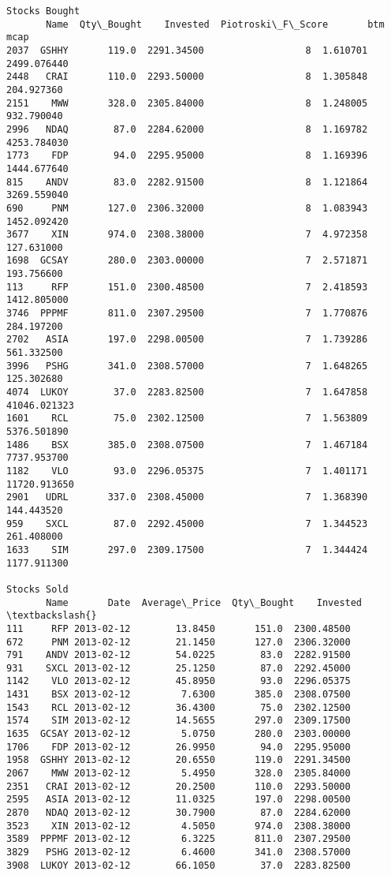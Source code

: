 \documentclass[11pt]{article}
\begin{document}
\begin{Verbatim}[commandchars=\\\{\}]
Stocks Bought
       Name  Qty\_Bought    Invested  Piotroski\_F\_Score       btm          mcap
2037  GSHHY       119.0  2291.34500                  8  1.610701   2499.076440
2448   CRAI       110.0  2293.50000                  8  1.305848    204.927360
2151    MWW       328.0  2305.84000                  8  1.248005    932.790040
2996   NDAQ        87.0  2284.62000                  8  1.169782   4253.784030
1773    FDP        94.0  2295.95000                  8  1.169396   1444.677640
815    ANDV        83.0  2282.91500                  8  1.121864   3269.559040
690     PNM       127.0  2306.32000                  8  1.083943   1452.092420
3677    XIN       974.0  2308.38000                  7  4.972358    127.631000
1698  GCSAY       280.0  2303.00000                  7  2.571871    193.756600
113     RFP       151.0  2300.48500                  7  2.418593   1412.805000
3746  PPPMF       811.0  2307.29500                  7  1.770876    284.197200
2702   ASIA       197.0  2298.00500                  7  1.739286    561.332500
3996   PSHG       341.0  2308.57000                  7  1.648265    125.302680
4074  LUKOY        37.0  2283.82500                  7  1.647858  41046.021323
1601    RCL        75.0  2302.12500                  7  1.563809   5376.501890
1486    BSX       385.0  2308.07500                  7  1.467184   7737.953700
1182    VLO        93.0  2296.05375                  7  1.401171  11720.913650
2901   UDRL       337.0  2308.45000                  7  1.368390    144.443520
959    SXCL        87.0  2292.45000                  7  1.344523    261.408000
1633    SIM       297.0  2309.17500                  7  1.344424   1177.911300

Stocks Sold
       Name       Date  Average\_Price  Qty\_Bought    Invested  \textbackslash{}
111     RFP 2013-02-12        13.8450       151.0  2300.48500
672     PNM 2013-02-12        21.1450       127.0  2306.32000
791    ANDV 2013-02-12        54.0225        83.0  2282.91500
931    SXCL 2013-02-12        25.1250        87.0  2292.45000
1142    VLO 2013-02-12        45.8950        93.0  2296.05375
1431    BSX 2013-02-12         7.6300       385.0  2308.07500
1543    RCL 2013-02-12        36.4300        75.0  2302.12500
1574    SIM 2013-02-12        14.5655       297.0  2309.17500
1635  GCSAY 2013-02-12         5.0750       280.0  2303.00000
1706    FDP 2013-02-12        26.9950        94.0  2295.95000
1958  GSHHY 2013-02-12        20.6550       119.0  2291.34500
2067    MWW 2013-02-12         5.4950       328.0  2305.84000
2351   CRAI 2013-02-12        20.2500       110.0  2293.50000
2595   ASIA 2013-02-12        11.0325       197.0  2298.00500
2870   NDAQ 2013-02-12        30.7900        87.0  2284.62000
3523    XIN 2013-02-12         4.5050       974.0  2308.38000
3589  PPPMF 2013-02-12         6.3225       811.0  2307.29500
3829   PSHG 2013-02-12         6.4600       341.0  2308.57000
3908  LUKOY 2013-02-12        66.1050        37.0  2283.82500


\end{Verbatim}
\end{document}
